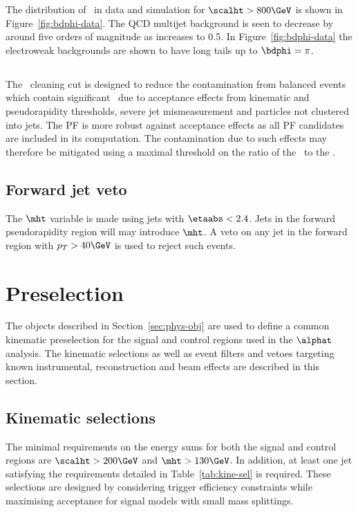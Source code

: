 The distribution of \bdphi~in data and simulation for $\scalht > 800\GeV$ is shown in Figure~\ref{fig:bdphi-data}.
The QCD multijet background is seen to decrease by around five orders of magnitude as \bdphi increases
to 0.5. In Figure~\ref{fig:bdphi-data} the electroweak backgrounds are
shown to have long tails up to $\bdphi = \pi$.

\subsection{\mhtmet}
\label{sec:mhtmet}
The \mhtmet~cleaning cut is designed to reduce the contamination from balanced events
which contain significant \mht~due to acceptance effects from kinematic and 
pseudorapidity thresholds, severe jet mismeasurement and particles not 
clustered into jets. The PF \met is more robust against acceptance effects as all PF candidates are
included in its computation. The contamination due to such effects may therefore be mitigated 
using a maximal threshold on the ratio of the \mht~to the \met.

\subsection{Forward jet veto}
\label{sec:fwd_jet_veto}
The $\mht$ variable is made using jets with $\etaabs < 2.4$. Jets in the forward pseudorapidity 
region will may introduce $\mht$. A veto on any jet in the forward region with $p_T > 40\GeV$
is used to reject such events. 

\section{Preselection}
\label{sec:presel}
The objects described in Section~\ref{sec:phys-obj} are used to define a common kinematic 
preselection for the signal and control regions used in the $\alphat$ analysis. 
The kinematic selections as well as event filters and vetoes targeting
known instrumental, reconstruction and beam effects are described in this section.

\subsection{Kinematic selections}
The minimal requirements on the energy sums for both the signal and control regions are
$\scalht > 200\GeV$ and $\mht > 130\GeV$. In addition, at least one jet satisfying the 
requirements detailed in Table~\ref{tab:kine-sel} is required. These selections are 
designed by considering trigger efficiency constraints while maximising acceptance for
signal models with small mass splittings.

